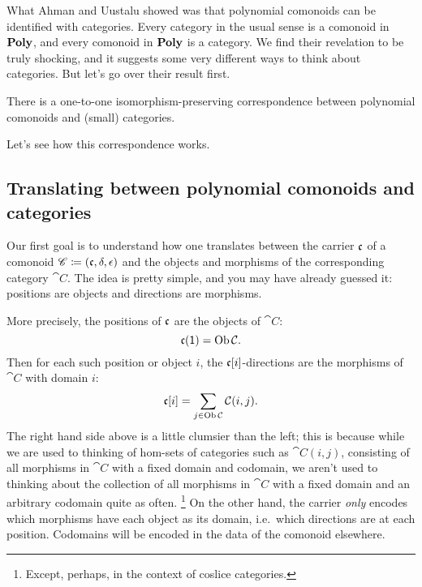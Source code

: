 \documentclass[Book-Poly]{subfiles}
\begin{document}
What Ahman and Uustalu showed was that polynomial comonoids can be identified with categories.
Every category in the usual sense is a comonoid in $\mathbf{Poly}$, and every comonoid in $\mathbf{Poly}$ is a category. 
We find their revelation to be truly shocking, and it suggests some very different ways to think about categories.
But let's go over their result first.

\begin{theorem}\label{thm.ahman_uustalu}
There is a one-to-one isomorphism-preserving correspondence between polynomial comonoids and (small) categories.
\end{theorem}

Let's see how this correspondence works.

\subsection{Translating between polynomial comonoids and categories}

Our first goal is to understand how one translates between the carrier $\mathfrak{c}$ of a comonoid $\mathscr{C}\coloneqq(\mathfrak{c},\delta,\epsilon)$ and the objects and morphisms of the corresponding category $\cat{C}$.
The idea is pretty simple, and you may have already guessed it: positions are objects and directions are morphisms.

More precisely, the positions of $\mathfrak{c}$ are the objects of $\cat{C}$:
\begin{equation} \label{eqn.pos_obj}
    \mathfrak{c}(\textsf{1})=\operatorname{Ob}\mathcal{C}.
\end{equation}
Then for each such position or object $i$, the $\mathfrak{c}[i]$-directions are the morphisms of $\cat{C}$ with domain $i$:
\begin{equation} \label{eqn.dir_mor}
    \mathfrak{c}[i]=\sum_{j\in\operatorname{Ob}\mathcal{C}}\mathcal{C}(i,j).
\end{equation}
The right hand side above is a little clumsier than the left; this is because while we are used to thinking of hom-sets of categories such as $\cat{C}(i,j)$, consisting of all morphisms in $\cat{C}$ with a fixed domain and codomain, we aren't used to thinking about the collection of all morphisms in $\cat{C}$ with a fixed domain and an arbitrary codomain quite as often.%
\footnote{Except, perhaps, in the context of coslice categories.}
On the other hand, the carrier \emph{only} encodes which morphisms have each object as its domain, i.e.\ which directions are at each position.
Codomains will be encoded in the data of the comonoid elsewhere.
\end{document}
